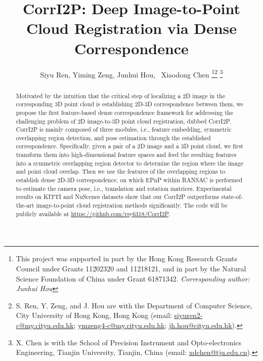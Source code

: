 \documentclass[lettersize,journal]{IEEEtran}
\begin{document}
\title{CorrI2P: Deep Image-to-Point Cloud Registration via Dense Correspondence}

\author{Siyu Ren, Yiming Zeng, Junhui Hou,~ Xiaodong Chen
\thanks{This project was supported in part by the Hong Kong Research Grants Council under Grants 11202320 and 11218121, and in part by the Natural Science Foundation of China under Grant 61871342.  \textit{Corresponding author: Junhui Hou}}\thanks{S. Ren, Y. Zeng, and J. Hou are with the Department of Computer Science,
City University of Hong Kong, Hong Kong (email: \href{siyuren2-c@my.cityu.edu.hk}{siyuren2-c@my.cityu.edu.hk}; \href{ymzeng4-c@my.cityu.edu.hk}{ymzeng4-c@my.cityu.edu.hk}; \href{jh.hou@cityu.edu.hk}{jh.hou@cityu.edu.hk}). }
\thanks{X. Chen is with the School of Precision Instrument and Opto-electronics Engineering, Tianjin University, Tianjin, China (email: \href{xdchen@tju.edu.cn}{xdchen@tju.edu.cn}).}}




\maketitle

\begin{abstract}
Motivated by the intuition that the critical step of localizing a 2D image in the corresponding 3D point cloud is establishing 2D-3D correspondence between them, we propose the first feature-based dense correspondence framework for addressing the challenging problem of 2D image-to-3D point cloud registration, dubbed CorrI2P. CorrI2P is mainly composed of three modules, i.e., feature embedding, symmetric overlapping region detection, and pose estimation through the established correspondence. Specifically, given a pair of a 2D image and a 3D point cloud, we first transform them into high-dimensional feature spaces and feed the resulting features into a symmetric overlapping region detector to determine the region where the image and point cloud overlap. Then we use the features of the overlapping regions to establish dense 2D-3D correspondence, on which EPnP within RANSAC is performed to estimate the camera pose, i.e., translation and rotation matrices. Experimental results on KITTI and NuScenes datasets show that our CorrI2P outperforms state-of-the-art image-to-point cloud registration methods significantly. The code will be publicly available at \href{https://github.com/rsy6318/CorrI2P}{https://github.com/rsy6318/CorrI2P}.
\end{abstract}
\end{document}
